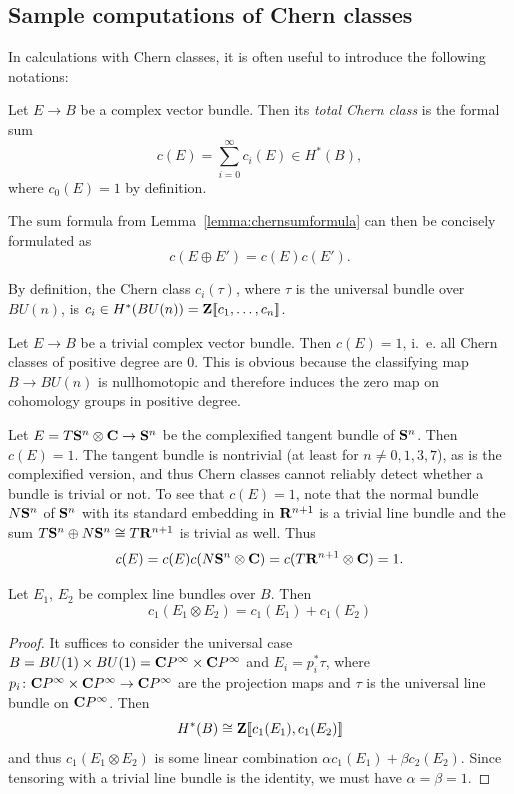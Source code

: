 \documentclass[a4paper,openany]{scrbook}
\begin{document}
\subsection{Sample computations of Chern classes}\label{subsec:computationschern}

In calculations with Chern classes, it is often useful to introduce the following notations:

\begin{defn}
Let $E \to B$ be a complex vector bundle. Then its \emph{total Chern class} is the formal sum
\[
c(E) = \sum_{i=0}^\infty c_i(E) \in H^*(B),
\]
where $c_0(E)=1$ by definition.
\end{defn}
The sum formula from Lemma~\ref{lemma:chernsumformula} can then be concisely formulated as
\[
c(E \oplus E') = c(E)c(E').
\]

By definition, the Chern class $c_i(\tau)$, where $\tau$ is the universal bundle over $BU(n)$, is $c_i \in H^*(BU(n)) = \Z\pow{c_1,\dots,c_n}$.

\begin{example}
Let $E \to B$ be a trivial complex vector bundle. Then $c(E) = 1$, i.~e. all Chern classes of positive degree are $0$. This is obvious because the classifying map $B \to BU(n)$ is nullhomotopic and therefore induces the zero map on cohomology groups in positive degree.
\end{example}

\begin{example}
Let $E=T\S^n \otimes \CC \to \S^n$ be the complexified tangent bundle of $\S^n$. Then $c(E)=1$. The tangent bundle is nontrivial (at least for $n \neq 0,1,3,7$), as is the complexified version, and thus Chern classes cannot reliably detect whether a bundle is trivial or not. To see that $c(E)=1$, note that the normal bundle $N\S^n$ of $\S^n$ with its standard embedding in $\R^{n+1}$ is a trivial line bundle and the sum $T\S^n \oplus N\S^n \cong T\R^{n+1}$ is trivial as well. Thus
\[
c(E) = c(E)c(N\S^n \otimes \CC) = c(T\R^{n+1}\otimes \CC) = 1.
\]
\end{example}

\begin{lemma}\label{lemma:chernoftensorproduct}
Let $E_1$, $E_2$ be complex line bundles over $B$. Then
\[
c_1(E_1 \otimes E_2) = c_1(E_1) + c_1(E_2)
\]
\end{lemma}
\begin{proof}
It suffices to consider the universal case $B=BU(1)\times BU(1) = \CP^\infty \times \CP^\infty$ and $E_i = p_i^*\tau$, where $p_i\colon \CP^\infty \times \CP^\infty \to \CP^\infty$ are the projection maps and $\tau$ is the universal line bundle on $\CP^\infty$. Then
\[
H^*(B) \cong \Z\pow{c_1(E_1),c_1(E_2)}
\]
and thus $c_1(E_1 \otimes E_2)$ is some linear combination $\alpha c_1(E_1) + \beta c_2(E_2)$. Since tensoring with a trivial line bundle is the identity, we must have $\alpha=\beta=1$. 
\end{proof}
\end{document}
